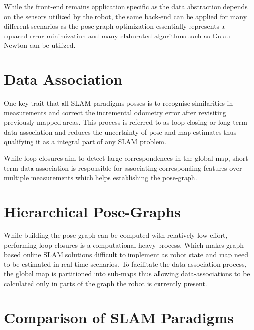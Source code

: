 While the front-end remains application specific as the data abstraction depends on the sensors utilized by the robot, the same back-end can be applied for many different scenarios as the pose-graph optimization essentially represents a squared-error minimization and many elaborated algorithms such as Gauss-Newton can be utilized.


\section{Data Association}\label{dataAssociation}
One key trait that all SLAM paradigms posses is to recognise similarities in measurements and correct the incremental odometry error after revisiting previously mapped areas. This process is referred to as loop-closing or long-term data-association and reduces the uncertainty of pose and map estimates thus qualifying it as a integral part of any SLAM problem. 

While loop-closures aim to detect large correspondences in the global map, short-term data-association is responsible for associating corresponding features over multiple measurements which helps establishing the pose-graph. 

\section{Hierarchical Pose-Graphs}
While building the pose-graph can be computed with relatively low effort, performing loop-closures is a computational heavy process. Which makes graph-based online SLAM solutions difficult to implement as robot state and map need to be estimated in real-time scenarios. To facilitate the data association process, the global map is partitioned into sub-maps thus allowing data-associations to be calculated only in parts of the graph the robot is currently present. 

\section{Comparison of SLAM Paradigms}


